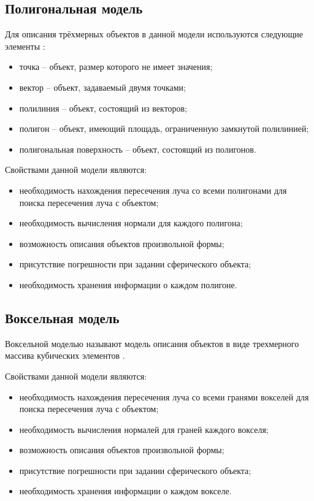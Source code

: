 \subsection{Полигональная модель}

Для описания трёхмерных объектов в данной модели используются следующие элементы \cite{piter_2002}: 

\begin{itemize}[label=---]
    \item точка -- объект, размер которого не имеет значения;
    \item вектор -- объект, задаваемый двумя точками;
    \item полилиния -- объект, состоящий из векторов;
    \item полигон -- объект, имеющий площадь, ограниченную замкнутой полилинией;
    \item полигональная поверхность -- объект, состоящий из полигонов.
\end{itemize}

Свойствами данной модели являются:
\begin{itemize}[label=---]
    \item необходимость нахождения пересечения луча со всеми полигонами для поиска пересечения луча с объектом;
    \item необходимость вычисления нормали для каждого полигона;
    \item возможность описания объектов произвольной формы;
    \item присутствие погрешности при задании сферического объекта;
    \item необходимость хранения информации о каждом полигоне.
\end{itemize}



\subsection{Воксельная модель}

Воксельной моделью называют модель описания объектов в виде трехмерного массива кубических элементов \cite{piter_2002}.

Свойствами данной модели являются:
\begin{itemize}[label=---]
    \item необходимость нахождения пересечения луча со всеми гранями вокселей для поиска пересечения луча с объектом;
    \item необходимость вычисления нормалей для граней каждого вокселя;
    \item возможность описания объектов произвольной формы;
    \item присутствие погрешности при задании сферического объекта;
    \item необходимость хранения информации о каждом вокселе.
\end{itemize}



